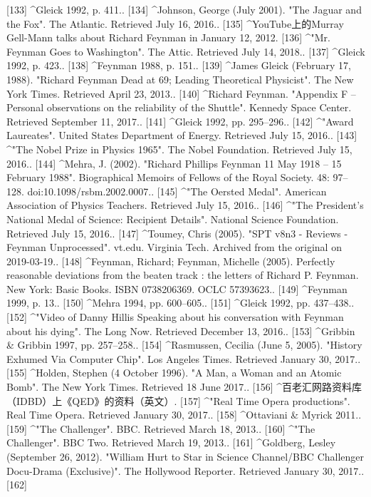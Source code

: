 [133]
^Gleick 1992, p. 411..
[134]
^Johnson, George (July 2001). "The Jaguar and the Fox". The Atlantic. Retrieved July 16, 2016..
[135]
^YouTube上的Murray Gell-Mann talks about Richard Feynman in January 12, 2012.
[136]
^"Mr. Feynman Goes to Washington". The Attic. Retrieved July 14, 2018..
[137]
^Gleick 1992, p. 423..
[138]
^Feynman 1988, p. 151..
[139]
^James Gleick (February 17, 1988). "Richard Feynman Dead at 69; Leading Theoretical Physicist". The New York Times. Retrieved April 23, 2013..
[140]
^Richard Feynman. "Appendix F – Personal observations on the reliability of the Shuttle". Kennedy Space Center. Retrieved September 11, 2017..
[141]
^Gleick 1992, pp. 295–296..
[142]
^"Award Laureates". United States Department of Energy. Retrieved July 15, 2016..
[143]
^"The Nobel Prize in Physics 1965". The Nobel Foundation. Retrieved July 15, 2016..
[144]
^Mehra, J. (2002). "Richard Phillips Feynman 11 May 1918 – 15 February 1988". Biographical Memoirs of Fellows of the Royal Society. 48: 97–128. doi:10.1098/rsbm.2002.0007..
[145]
^"The Oersted Medal". American Association of Physics Teachers. Retrieved July 15, 2016..
[146]
^"The President's National Medal of Science: Recipient Details". National Science Foundation. Retrieved July 15, 2016..
[147]
^Toumey, Chris (2005). "SPT v8n3 - Reviews - Feynman Unprocessed". vt.edu. Virginia Tech. Archived from the original on 2019-03-19..
[148]
^Feynman, Richard; Feynman, Michelle (2005). Perfectly reasonable deviations from the beaten track : the letters of Richard P. Feynman. New York: Basic Books. ISBN 0738206369. OCLC 57393623..
[149]
^Feynman 1999, p. 13..
[150]
^Mehra 1994, pp. 600–605..
[151]
^Gleick 1992, pp. 437–438..
[152]
^"Video of Danny Hillis Speaking about his conversation with Feynman about his dying". The Long Now. Retrieved December 13, 2016..
[153]
^Gribbin & Gribbin 1997, pp. 257–258..
[154]
^Rasmussen, Cecilia (June 5, 2005). "History Exhumed Via Computer Chip". Los Angeles Times. Retrieved January 30, 2017..
[155]
^Holden, Stephen (4 October 1996). "A Man, a Woman and an Atomic Bomb". The New York Times. Retrieved 18 June 2017..
[156]
^百老汇网路资料库（IDBD）上《QED》的资料（英文）.
[157]
^"Real Time Opera productions". Real Time Opera. Retrieved January 30, 2017..
[158]
^Ottaviani & Myrick 2011..
[159]
^"The Challenger". BBC. Retrieved March 18, 2013..
[160]
^"The Challenger". BBC Two. Retrieved March 19, 2013..
[161]
^Goldberg, Lesley (September 26, 2012). "William Hurt to Star in Science Channel/BBC Challenger Docu-Drama (Exclusive)". The Hollywood Reporter. Retrieved January 30, 2017..
[162]

